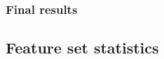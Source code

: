 \subsubsection{Final results}



\newpage
\subsection{Feature set statistics}
\label{appendix:fs}


